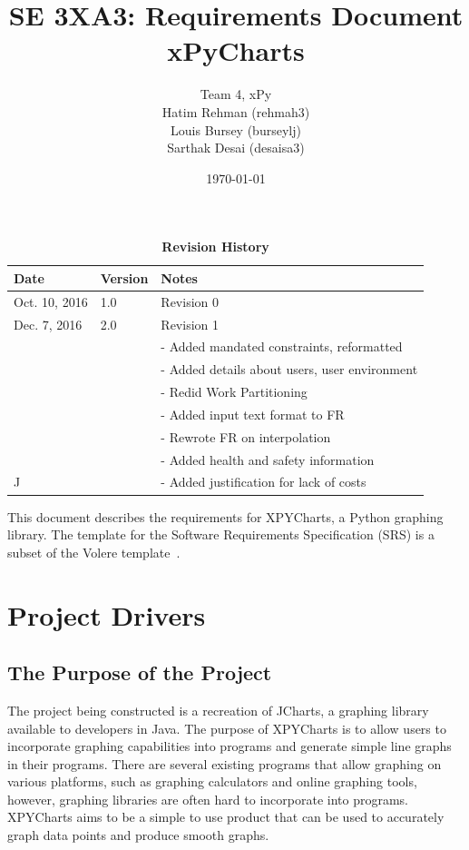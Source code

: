 \documentclass[12pt, titlepage]{article}
\title{SE 3XA3: Requirements Document\\xPyCharts}
\author{Team 4, xPy
		\\ Hatim Rehman (rehmah3)
		\\ Louis Bursey (burseylj)
		\\ Sarthak Desai (desaisa3)
}
\date{\today}
\begin{document}
\maketitle

\tableofcontents
\listoftables
\listoffigures

\begin{table}[bp]
\caption{\bf Revision History}
\begin{tabularx}{\textwidth}{p{3cm}p{2cm}X}
\toprule {\bf Date} & {\bf Version} & {\bf Notes}\\
\midrule
Oct. 10, 2016 & 1.0 & Revision 0\\
Dec. 7, 2016 &  2.0 & Revision 1 \\
 & & - Added mandated constraints, reformatted \\
 & & - Added details about users, user environment \\
 & & - Redid Work Partitioning \\
 & & - Added input text format to FR \\
 & & - Rewrote FR on interpolation \\
 & & - Added health and safety information \\
 J& & - Added justification for lack of costs \\ 
\bottomrule
\end{tabularx}
\end{table}

\newpage


This document describes the requirements for XPYCharts, a Python graphing library.  The template for the Software
Requirements Specification (SRS) is a subset of the Volere
template~\citep{RobertsonAndRobertson2012}.  

\section{Project Drivers}

\subsection{The Purpose of the Project}
The project being constructed is a recreation of JCharts, a graphing library available to developers in Java. The purpose of XPYCharts is to allow users to incorporate graphing capabilities into programs and generate simple line graphs in their programs. There are several existing programs that allow graphing on various platforms, such as graphing calculators and online graphing tools, however, graphing libraries are often hard to incorporate into programs. XPYCharts aims to be a simple to use product that can be used to accurately graph data points and produce smooth graphs.
\end{document}
